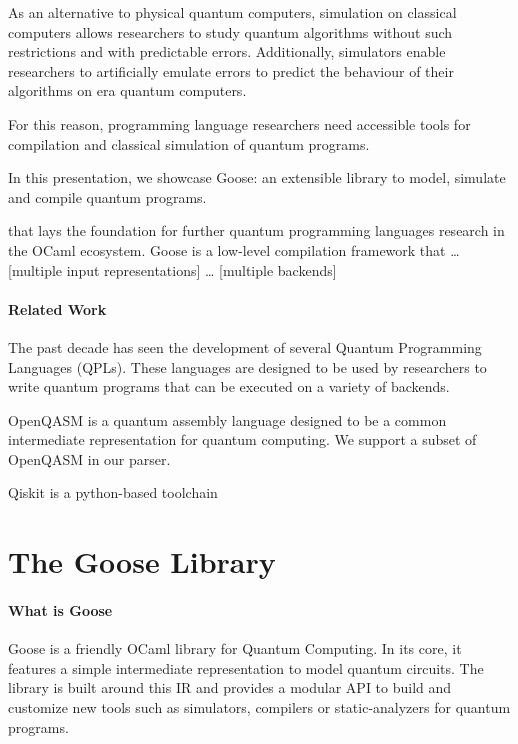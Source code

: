 \documentclass[a4paper]{easychair}
\begin{document}
As an alternative to physical quantum computers, simulation on classical computers allows researchers to study quantum algorithms without such restrictions and with predictable errors. Additionally, simulators enable researchers to artificially emulate errors to predict the behaviour of their algorithms on \nisq era quantum computers.

For this reason, programming language researchers need accessible tools for compilation and classical simulation of quantum programs.

In this presentation, we showcase Goose: an extensible library to model, simulate and compile quantum programs.

that lays the foundation for further quantum programming languages research in the OCaml ecosystem. Goose is a low-level compilation framework that … [multiple input representations] … [multiple backends]

\paragraph*{Related Work}

The past decade has seen the development of several Quantum Programming Languages (QPLs). These languages are designed to be used by researchers to write quantum programs that can be executed on a variety of backends. 

OpenQASM \cite{Cross2022} is a quantum assembly language designed to be a common intermediate representation for quantum computing.  We support a subset of OpenQASM in our parser.

Qiskit is a python-based toolchain

\section{The Goose Library}

\paragraph*{What is Goose} Goose is a friendly OCaml library for Quantum Computing. In its core, it features a simple intermediate representation to model quantum circuits. The library is built around this IR and provides a modular API to build and customize new tools such as simulators, compilers or static-analyzers for quantum programs.
\end{document}

